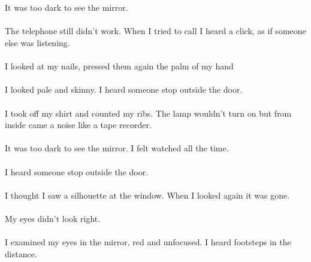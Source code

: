 \documentclass{article}
\begin{document}
    \section{}
    It was too dark to see the mirror. \\\\The telephone still didn't work. When I tried to call I heard a click, as if someone else was listening. \\\\I looked at my nails, pressed them again the palm of my hand \\\\I looked pale and skinny. I heard someone stop outside the door. \\\\I took off my shirt and counted my ribs. The lamp wouldn't turn on but from inside came a noise like a tape recorder. \\\\It was too dark to see the mirror. I felt watched all the time. \\\\I heard someone stop outside the door. \\\\I thought I saw a silhouette at the window. When I looked again it was gone. \\\\My eyes didn't look right. \\\\I examined my eyes in the mirror, red and unfocused. I heard footsteps in the distance. \\\\
    \newpage
    
\end{document}
